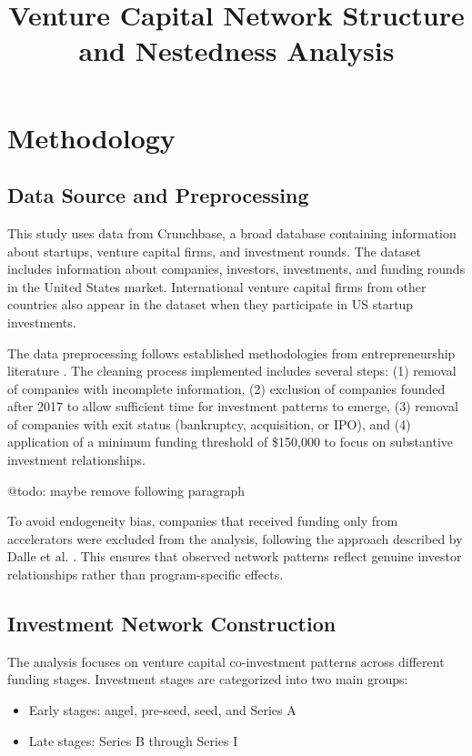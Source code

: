 \documentclass[12pt]{article}
\title{Venture Capital Network Structure and Nestedness Analysis}
\author{}
\date{}
\begin{document}
\maketitle

\section{Methodology}

\subsection{Data Source and Preprocessing}

This study uses data from Crunchbase, a broad database containing information about startups, venture capital firms, and investment rounds. The dataset includes information about companies, investors, investments, and funding rounds in the United States market. International venture capital firms from other countries also appear in the dataset when they participate in US startup investments.

The data preprocessing follows established methodologies from entrepreneurship literature \cite{Dalle2025}. The cleaning process implemented includes several steps: (1) removal of companies with incomplete information, (2) exclusion of companies founded after 2017 to allow sufficient time for investment patterns to emerge, (3) removal of companies with exit status (bankruptcy, acquisition, or IPO), and (4) application of a minimum funding threshold of \$150,000 to focus on substantive investment relationships.

@todo: maybe remove following paragraph

To avoid endogeneity bias, companies that received funding only from accelerators were excluded from the analysis, following the approach described by Dalle et al. \cite{Dalle2025}. This ensures that observed network patterns reflect genuine investor relationships rather than program-specific effects.

\subsection{Investment Network Construction}

The analysis focuses on venture capital co-investment patterns across different funding stages. Investment stages are categorized into two main groups:
\begin{itemize}
    \item Early stages: angel, pre-seed, seed, and Series A
    \item Late stages: Series B through Series I
\end{itemize}
\end{document}
